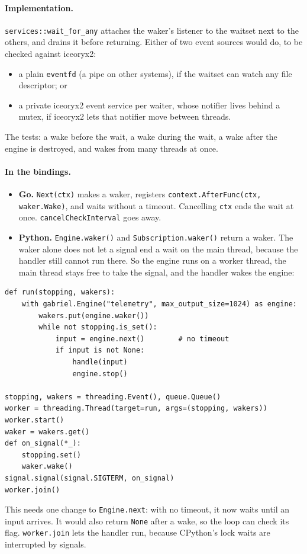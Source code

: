 \documentclass[11pt]{article}
\newcommand{\code}[1]{\texttt{#1}}
\begin{document}
\paragraph{Implementation.} \code{services::wait\_for\_any} attaches the
waker's listener to the waitset next to the others, and drains it before
returning. Either of two event sources would do, to be checked against
iceoryx2:
\begin{itemize}[nosep]
  \item a plain \code{eventfd} (a pipe on other systems), if the waitset can
        watch any file descriptor; or
  \item a private iceoryx2 event service per waiter, whose notifier lives
        behind a mutex, if iceoryx2 lets that notifier move between threads.
\end{itemize}
The tests: a wake before the wait, a wake during the wait, a wake after the
engine is destroyed, and wakes from many threads at once.

\paragraph{In the bindings.}
\begin{itemize}[nosep]
  \item \textbf{Go.} \code{Next(ctx)} makes a waker, registers
        \code{context.AfterFunc(ctx, waker.Wake)}, and waits without a
        timeout. Cancelling \code{ctx} ends the wait at once.
        \code{cancelCheckInterval} goes away.
  \item \textbf{Python.} \code{Engine.waker()} and
        \code{Subscription.waker()} return a waker. The waker alone does not
        let a signal end a wait on the main thread, because the handler still
        cannot run there. So the engine runs on a worker thread, the main
        thread stays free to take the signal, and the handler wakes the engine:
\end{itemize}
\begin{lstlisting}
def run(stopping, wakers):
    with gabriel.Engine("telemetry", max_output_size=1024) as engine:
        wakers.put(engine.waker())
        while not stopping.is_set():
            input = engine.next()        # no timeout
            if input is not None:
                handle(input)
                engine.stop()

stopping, wakers = threading.Event(), queue.Queue()
worker = threading.Thread(target=run, args=(stopping, wakers))
worker.start()
waker = wakers.get()
def on_signal(*_):
    stopping.set()
    waker.wake()
signal.signal(signal.SIGTERM, on_signal)
worker.join()
\end{lstlisting}
This needs one change to \code{Engine.next}: with no timeout, it now waits
until an input arrives. It would also return \code{None} after a wake, so the
loop can check its flag. \code{worker.join} lets the handler run, because
CPython's lock waits are interrupted by signals.
\end{document}
